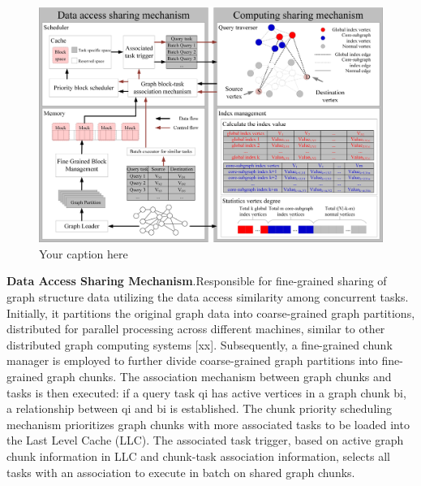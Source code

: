 \documentclass[lettersize,journal]{IEEEtran} %
\begin{document}
\begin{figure}[!t]
    \centering
    \includegraphics[width=\columnwidth]{系统架构.png}
    \caption{Your caption here}
    \label{fig:系统架构}
  \end{figure}
  

{\bf{Data Access Sharing Mechanism}}.Responsible for fine-grained sharing of graph structure data utilizing the data access similarity among concurrent tasks. Initially, it partitions the original graph data into coarse-grained graph partitions, distributed for parallel processing across different machines, similar to other distributed graph computing systems [xx]. Subsequently, a fine-grained chunk manager is employed to further divide coarse-grained graph partitions into fine-grained graph chunks. The association mechanism between graph chunks and tasks is then executed: if a query task qi has active vertices in a graph chunk bi, a relationship between qi and bi is established. The chunk priority scheduling mechanism prioritizes graph chunks with more associated tasks to be loaded into the Last Level Cache (LLC). The associated task trigger, based on active graph chunk information in LLC and chunk-task association information, selects all tasks with an association to execute in batch on shared graph chunks.
\end{document}
